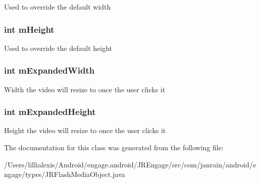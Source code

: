 \label{classcom_1_1janrain_1_1android_1_1engage_1_1types_1_1_j_r_flash_media_object_aa39f004a83a206ca8644d441c792e45b}
Used to override the default width \hypertarget{classcom_1_1janrain_1_1android_1_1engage_1_1types_1_1_j_r_flash_media_object_a3d6a057795437ab1becbd09b09ea7a90}{
\subsubsection[{mHeight}]{\setlength{\rightskip}{0pt plus 5cm}int {\bf mHeight}}}
\label{classcom_1_1janrain_1_1android_1_1engage_1_1types_1_1_j_r_flash_media_object_a3d6a057795437ab1becbd09b09ea7a90}
Used to override the default height \hypertarget{classcom_1_1janrain_1_1android_1_1engage_1_1types_1_1_j_r_flash_media_object_a89c309c9877e843c2a151f91759be11b}{
\subsubsection[{mExpandedWidth}]{\setlength{\rightskip}{0pt plus 5cm}int {\bf mExpandedWidth}}}
\label{classcom_1_1janrain_1_1android_1_1engage_1_1types_1_1_j_r_flash_media_object_a89c309c9877e843c2a151f91759be11b}
Width the video will resize to once the user clicks it \hypertarget{classcom_1_1janrain_1_1android_1_1engage_1_1types_1_1_j_r_flash_media_object_a43b25e7ecfdedf6ff98bde0e4b48c71c}{
\subsubsection[{mExpandedHeight}]{\setlength{\rightskip}{0pt plus 5cm}int {\bf mExpandedHeight}}}
\label{classcom_1_1janrain_1_1android_1_1engage_1_1types_1_1_j_r_flash_media_object_a43b25e7ecfdedf6ff98bde0e4b48c71c}
Height the video will resize to once the user clicks it 

The documentation for this class was generated from the following file:\begin{DoxyCompactItemize}
\item 
/Users/lillialexis/Android/engage.android/JREngage/src/com/janrain/android/engage/types/JRFlashMediaObject.java\end{DoxyCompactItemize}
